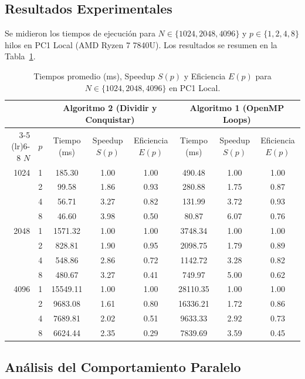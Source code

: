 \subsection{Resultados Experimentales}
Se midieron los tiempos de ejecución para $N \in \{1024, 2048, 4096\}$ y $p \in \{1, 2, 4, 8\}$ hilos en PC1 Local (AMD Ryzen 7 7840U). Los resultados se resumen en la Tabla~\ref{tab:escalabilidad_debil}.

\begin{table}[htbp]
\centering
\footnotesize
\setlength{\tabcolsep}{4pt}
\caption{Tiempos promedio (ms), Speedup $S(p)$ y Eficiencia $E(p)$ para $N \in \{1024, 2048, 4096\}$ en PC1 Local.}
\label{tab:escalabilidad_debil}
\begin{tabular}{r c ccc ccc}
\toprule
& & \multicolumn{3}{c}{\textbf{Algoritmo 2 (Dividir y Conquistar)}} & \multicolumn{3}{c}{\textbf{Algoritmo 1 (OpenMP Loops)}} \\
\cmidrule(lr){3-5} \cmidrule(lr){6-8}
$N$ & $p$ & Tiempo (ms) & Speedup $S(p)$ & Eficiencia $E(p)$ & Tiempo (ms) & Speedup $S(p)$ & Eficiencia $E(p)$ \\
\midrule
1024 & 1 & 185.30 & 1.00 & 1.00 & 490.48 & 1.00 & 1.00 \\
    & 2 & 99.58 & 1.86 & 0.93 & 280.88 & 1.75 & 0.87 \\
    & 4 & 56.71 & 3.27 & 0.82 & 131.99 & 3.72 & 0.93 \\
    & 8 & 46.60 & 3.98 & 0.50 & 80.87 & 6.07 & 0.76 \\
\midrule
2048 & 1 & 1571.32 & 1.00 & 1.00 & 3748.34 & 1.00 & 1.00 \\
    & 2 & 828.81 & 1.90 & 0.95 & 2098.75 & 1.79 & 0.89 \\
    & 4 & 548.86 & 2.86 & 0.72 & 1142.72 & 3.28 & 0.82 \\
    & 8 & 480.67 & 3.27 & 0.41 & 749.97 & 5.00 & 0.62 \\
\midrule
4096 & 1 & 15549.11 & 1.00 & 1.00 & 28110.35 & 1.00 & 1.00 \\
    & 2 & 9683.08 & 1.61 & 0.80 & 16336.21 & 1.72 & 0.86 \\
    & 4 & 7689.81 & 2.02 & 0.51 & 9633.33 & 2.92 & 0.73 \\
    & 8 & 6624.44 & 2.35 & 0.29 & 7839.69 & 3.59 & 0.45 \\
\bottomrule
\end{tabular}
\end{table}

\subsection{Análisis del Comportamiento Paralelo}

